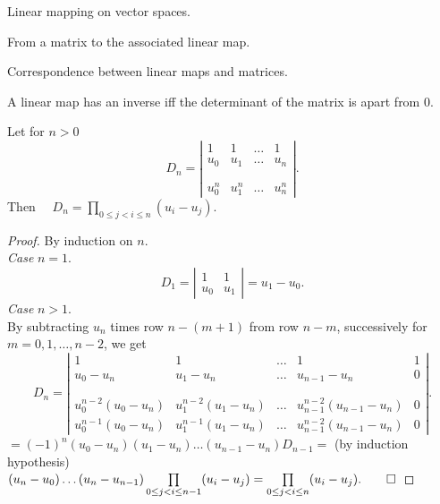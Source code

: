 \begin{definition}
  Linear mapping on vector spaces.
\end{definition}

\begin{definition}
  From a matrix to the associated linear map.  
\end{definition}

\begin{lemma}
  Correspondence between linear maps and matrices.
\end{lemma}

\begin{proposition}\label{lemLinInvDet}
  A linear map has an inverse iff the determinant of the matrix is
  apart from $0$.
\end{proposition}

\begin{lemma}[Vandermonde]\label{lemVand}
Let for $n>0$ 
$$D_n =
\left|
\begin{array}{llll}
1 &1 &\ldots &1 \\
u_0 &u_1 &\ldots &u_n \\
&&& \\
&&& \\
u_0^n &u_1^n &\ldots &u_n^n
\end{array}
\right|.$$
Then $\quad D_n = \prod\limits_{0\leq j < i\leq n}(u_i - u_j).$
\end{lemma}
\begin{proof}
By induction on $n.$\\[1ex]
{\em Case }$n=1.$\\
$$D_1 = \left|\begin{array}{ll}
1 &1 \\
u_0 &u_1
\end{array}\right|
= u_1 - u_0.$$
{\em Case }$n>1.$\\
By subtracting $u_n$ times 
row $n-(m+1)$ from row  $n-m$, successively for $m = 0,1,\ldots ,n-2$,
we get 
$$D_n =
\left|
\begin{array}{lllll}
1 &1 &\ldots &1 &1\\
u_0 - u_n &u_1 - u_n &\ldots &u_{n-1} - u_n &0\\
&&& \\
&&& \\
u_0^{n-2}(u_0-u_n) &u_1^{n-2}(u_1-u_n) &\ldots
&u_{n-1}^{n-2}(u_{n-1}-u_n) &0\\
u_0^{n-1}(u_0-u_n) &u_1^{n-1}(u_1-u_n) &\ldots
&u_{n-1}^{n-2}(u_{n-1}-u_n) &0
\end{array}
\right|.$$
$ = (-1)^n(u_0-u_n)(u_1-u_n)\ldots(u_{n-1}-u_n)D_{n-1} =$ (by induction
hypothesis)\\ 
$(u_n-u_0)\ldots(u_n-u_{n-1})
\prod\limits_{0\leq j < i\leq n-1}(u_i - u_j) =  
\prod\limits_{0\leq j < i\leq n}(u_i - u_j).\hfill\qed$ 
\end{proof}

